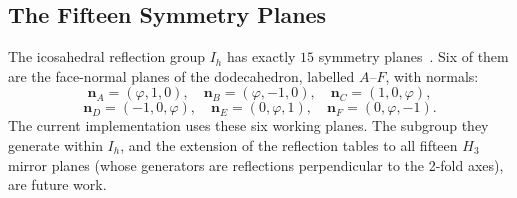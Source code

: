 \documentclass[12pt]{article}
\theoremstyle{definition}
\theoremstyle{remark}
\begin{document}
\subsection{The Fifteen Symmetry Planes}
The icosahedral reflection group $I_h$ has exactly $15$ symmetry
planes~\cite{coxeter,grove}.  Six of them are the face-normal planes
of the dodecahedron, labelled $A$--$F$, with normals:
\[
  \mathbf{n}_A=(\varphi,1,0),\quad
  \mathbf{n}_B=(\varphi,-1,0),\quad
  \mathbf{n}_C=(1,0,\varphi),
\]
\[
  \mathbf{n}_D=(-1,0,\varphi),\quad
  \mathbf{n}_E=(0,\varphi,1),\quad
  \mathbf{n}_F=(0,\varphi,-1).
\]
The current implementation uses these six working planes.
The subgroup they generate within $I_h$, and the extension of the
reflection tables to all fifteen $H_3$ mirror planes (whose generators
are reflections perpendicular to the 2-fold axes), are future work.
\end{document}
